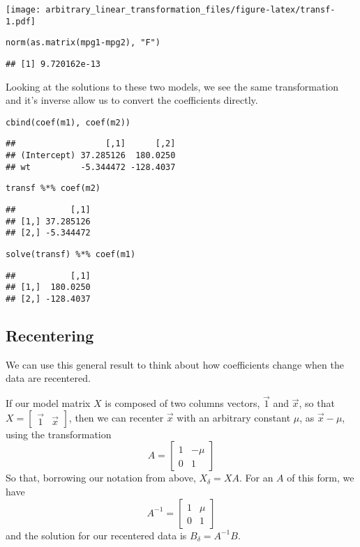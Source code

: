 \documentclass[]{article}
\begin{document}
\texttt{[image: arbitrary\_linear\_transformation\_files/figure-latex/transf-1.pdf]}

\begin{verbatim}
norm(as.matrix(mpg1-mpg2), "F")
\end{verbatim}

\begin{verbatim}
## [1] 9.720162e-13
\end{verbatim}

Looking at the solutions to these two models, we see the same
transformation and it's inverse allow us to convert the coefficients
directly.

\begin{verbatim}
cbind(coef(m1), coef(m2))
\end{verbatim}

\begin{verbatim}
##                  [,1]      [,2]
## (Intercept) 37.285126  180.0250
## wt          -5.344472 -128.4037
\end{verbatim}

\begin{verbatim}
transf %*% coef(m2)
\end{verbatim}

\begin{verbatim}
##           [,1]
## [1,] 37.285126
## [2,] -5.344472
\end{verbatim}

\begin{verbatim}
solve(transf) %*% coef(m1)
\end{verbatim}

\begin{verbatim}
##           [,1]
## [1,]  180.0250
## [2,] -128.4037
\end{verbatim}

\hypertarget{recentering}{%
\subsection{Recentering}\label{recentering}}

We can use this general result to think about how coefficients change
when the data are recentered.

If our model matrix \(X\) is composed of two columns vectors,
\(\vec{1}\) and \(\vec{x}\), so that
\(X=\begin{bmatrix} \vec{1} & \vec{x} \end{bmatrix}\), then we can
recenter \(\vec{x}\) with an arbitrary constant \(\mu\), as
\(\vec{x}-\mu\), using the transformation
\[A=\begin{bmatrix} 1  & -\mu \\ 0 & 1 \end{bmatrix}\] So that,
borrowing our notation from above, \(X_\delta=XA\). For an \(A\) of this
form, we have \[A^{-1}=\begin{bmatrix} 1  & \mu \\ 0 & 1 \end{bmatrix}\]
and the solution for our recentered data is \(B_\delta=A^{-1}B\).
\end{document}
